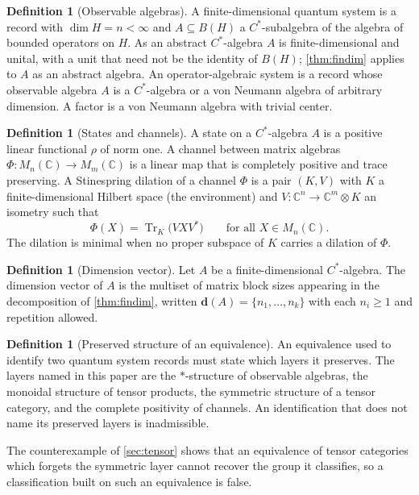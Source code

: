 \documentclass[11pt,letterpaper]{article}
\theoremstyle{definition}
\newtheorem{definition}[theorem]{Definition}
\theoremstyle{remark}
\begin{document}
\begin{definition}[Observable algebras]
\label{def:observables}
A finite-dimensional quantum system is a record with $\dim H = n < \infty$ and $A \subseteq B(H)$ a $C^*$-subalgebra of the algebra of bounded operators on $H$. As an abstract $C^*$-algebra $A$ is finite-dimensional and unital, with a unit that need not be the identity of $B(H)$; \cref{thm:findim} applies to $A$ as an abstract algebra. An operator-algebraic system is a record whose observable algebra $A$ is a $C^*$-algebra or a von Neumann algebra of arbitrary dimension. A factor is a von Neumann algebra with trivial center.
\end{definition}

\begin{definition}[States and channels]
\label{def:channels}
A state on a $C^*$-algebra $A$ is a positive linear functional $\rho$ of norm one. A channel between matrix algebras $\Phi: M_n(\mathbb{C}) \to M_m(\mathbb{C})$ is a linear map that is completely positive and trace preserving. A Stinespring dilation of a channel $\Phi$ is a pair $(K, V)$ with $K$ a finite-dimensional Hilbert space (the environment) and $V: \mathbb{C}^n \to \mathbb{C}^m \otimes K$ an isometry such that
\[
\Phi(X) = \operatorname{Tr}_K\bigl(V X V^*\bigr) \qquad \text{for all } X \in M_n(\mathbb{C}).
\]
The dilation is minimal when no proper subspace of $K$ carries a dilation of $\Phi$.
\end{definition}

\begin{definition}[Dimension vector]
\label{def:dimvec}
Let $A$ be a finite-dimensional $C^*$-algebra. The dimension vector of $A$ is the multiset of matrix block sizes appearing in the decomposition of \cref{thm:findim}, written $\mathbf{d}(A) = \{n_1, \dots, n_k\}$ with each $n_i \geq 1$ and repetition allowed.
\end{definition}

\begin{definition}[Preserved structure of an equivalence]
\label{def:preserved}
An equivalence used to identify two quantum system records must state which layers it preserves. The layers named in this paper are the $*$-structure of observable algebras, the monoidal structure of tensor products, the symmetric structure of a tensor category, and the complete positivity of channels. An identification that does not name its preserved layers is inadmissible.
\end{definition}

The counterexample of \cref{sec:tensor} shows that an equivalence of tensor categories which forgets the symmetric layer cannot recover the group it classifies, so a classification built on such an equivalence is false.
\end{document}
